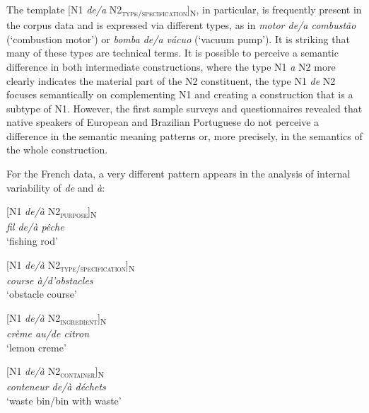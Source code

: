 \documentclass[output=paper]{langsci/langscibook}
\begin{document}
\hspace*{-1.11124pt}The template [N1 \textit{de/a} N2\textsubscript{\scshape type/specification}]\textsubscript{N}, in particular, is frequently present in the corpus data and is expressed via different types, as in \textit{motor de/a combustão} (`combustion motor') or \textit{bomba de/a vácuo} (`vacuum pump'). It is striking that many of these types are technical terms. It is possible to perceive a semantic difference in both intermediate constructions, where the type N1 \textit{a} N2 more clearly indicates the material part of the N2 constituent, the type N1 \textit{de} N2 focuses semantically on complementing N1 and creating a construction that is a subtype of N1. However, the first sample surveys and questionnaires revealed that native speakers of European and Brazilian Portuguese do not perceive a difference in the semantic meaning patterns or, more precisely, in the semantics of the whole construction.

For the French data, a very different pattern appears in the analysis of internal variability of \textit{de} and \textit{à}:

\begin{exe}\ex\begin{minipage}[t]{0.4\textwidth}
[N1 \textit{de/à} N2\textsubscript{\scshape purpose}]\textsubscript{N}\\
\textit{fil de/à pêche}\\
`fishing rod'
\end{minipage}\hfill
\begin{minipage}[t]{0.45\textwidth}
[N1 \textit{de/à} N2\textsubscript{\scshape type/specification}]\textsubscript{N}\\
\textit{course à/d’obstacles}\\
`obstacle course'
\end{minipage}%
\end{exe}

\begin{exe}\ex\begin{minipage}[t]{0.4\textwidth}
[N1 \textit{de/à} N2\textsubscript{\scshape ingredient}]\textsubscript{N}\\
\textit{crème au/de citron}\\
`lemon creme'
\end{minipage}\hfill\begin{minipage}[t]{0.45\textwidth}
[N1 \textit{de/à} N2\textsubscript{\scshape container}]\textsubscript{N}\\
\textit{conteneur de/à déchets }\\
`waste bin\slash bin with waste'
\end{minipage}%
\end{exe}
\end{document}
